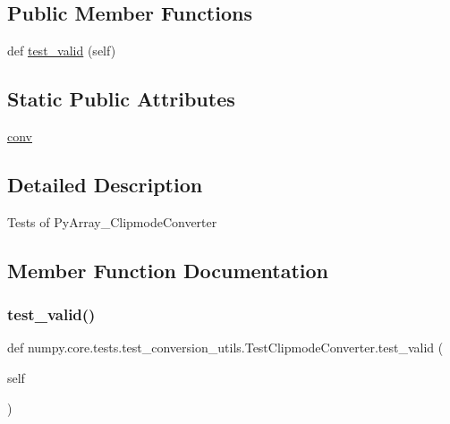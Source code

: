 \subsection*{Public Member Functions}
\begin{DoxyCompactItemize}
\item 
def \hyperlink{classnumpy_1_1core_1_1tests_1_1test__conversion__utils_1_1TestClipmodeConverter_ab21b8e25c41a1ae2e72f95aa537afb99}{test\+\_\+valid} (self)
\end{DoxyCompactItemize}
\subsection*{Static Public Attributes}
\begin{DoxyCompactItemize}
\item 
\hyperlink{classnumpy_1_1core_1_1tests_1_1test__conversion__utils_1_1TestClipmodeConverter_ab45dd3cafcbf80b141c46327b52ccba0}{conv}
\end{DoxyCompactItemize}


\subsection{Detailed Description}
\begin{DoxyVerb}Tests of PyArray_ClipmodeConverter \end{DoxyVerb}
 

\subsection{Member Function Documentation}
\mbox{\label{classnumpy_1_1core_1_1tests_1_1test__conversion__utils_1_1TestClipmodeConverter_ab21b8e25c41a1ae2e72f95aa537afb99}} 
\subsubsection{\texorpdfstring{test\+\_\+valid()}{test\_valid()}}
{\footnotesize\ttfamily def numpy.\+core.\+tests.\+test\+\_\+conversion\+\_\+utils.\+Test\+Clipmode\+Converter.\+test\+\_\+valid (\begin{DoxyParamCaption}\item[{}]{self }\end{DoxyParamCaption})}



